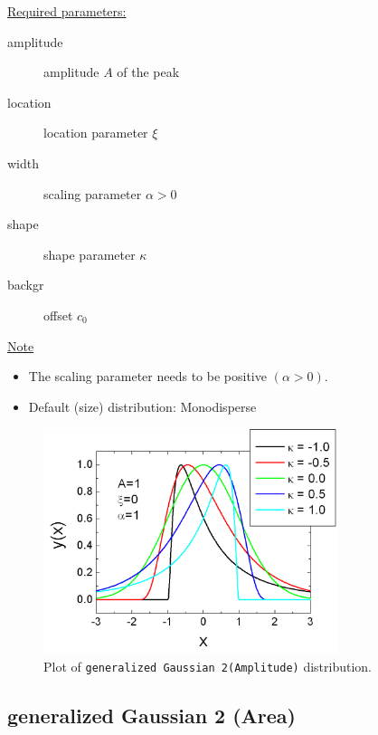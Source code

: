 \uline{Required parameters:}
\begin{description}
    \item[amplitude] amplitude $A$ of the peak
    \item[location] location parameter $\xi$
    \item[width] scaling parameter $\alpha > 0$
    \item[shape] shape parameter $\kappa$
    \item[backgr] offset $c_0$
\end{description}


\uline{Note}
\begin{itemize}
  \item The scaling parameter needs to be positive $(\alpha > 0)$.
  \item Default (size) distribution: Monodisperse
\end{itemize}

\begin{figure}[htb]
\begin{center}
\includegraphics[width=0.768\textwidth]{generalizedGaussian2Amplitude.png}
\end{center}
\caption{Plot of \texttt{generalized Gaussian 2(Amplitude)}
distribution.} \label{fig:generalizedGaussian2Amplitude}
\end{figure}

\clearpage
\subsection{generalized Gaussian 2 (Area)} ~\\
\label{sec:generalizedGaussian2Area}

